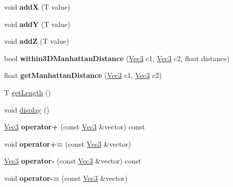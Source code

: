 \begin{DoxyCompactItemize}
\item 
\hypertarget{classVec3_a62a51e17139ac62fde2a8e764b423aa5}{}void {\bfseries add\+X} (T value)\label{classVec3_a62a51e17139ac62fde2a8e764b423aa5}

\item 
\hypertarget{classVec3_acedfa1c9f7193c47271c53dd08f883bc}{}void {\bfseries add\+Y} (T value)\label{classVec3_acedfa1c9f7193c47271c53dd08f883bc}

\item 
\hypertarget{classVec3_a7e31142017c656f7a8a20aa27641334d}{}void {\bfseries add\+Z} (T value)\label{classVec3_a7e31142017c656f7a8a20aa27641334d}

\item 
\hypertarget{classVec3_a705466eb1217ef25aca9482732d47f22}{}bool {\bfseries within3\+D\+Manhattan\+Distance} (\hyperlink{classVec3}{Vec3} c1, \hyperlink{classVec3}{Vec3} c2, float distance)\label{classVec3_a705466eb1217ef25aca9482732d47f22}

\item 
\hypertarget{classVec3_acfaec6bb2ef1e69dadce32ca48bfe8d7}{}float {\bfseries get\+Manhattan\+Distance} (\hyperlink{classVec3}{Vec3} c1, \hyperlink{classVec3}{Vec3} c2)\label{classVec3_acfaec6bb2ef1e69dadce32ca48bfe8d7}

\item 
T \hyperlink{classVec3_a01241f3738dd50013afc6c84e53a48a1}{get\+Length} ()
\item 
void \hyperlink{classVec3_ad648937145b298fa1f018143d34c56e9}{display} ()
\item 
\hypertarget{classVec3_a19831387133a4ff98f8881d3b667e694}{}\hyperlink{classVec3}{Vec3} {\bfseries operator+} (const \hyperlink{classVec3}{Vec3} \&vector) const \label{classVec3_a19831387133a4ff98f8881d3b667e694}

\item 
\hypertarget{classVec3_a500dc9307709f76f8c8dd8cdbb5eb729}{}void {\bfseries operator+=} (const \hyperlink{classVec3}{Vec3} \&vector)\label{classVec3_a500dc9307709f76f8c8dd8cdbb5eb729}

\item 
\hypertarget{classVec3_a639c69231c65cee4bcf134c68d255b6b}{}\hyperlink{classVec3}{Vec3} {\bfseries operator-\/} (const \hyperlink{classVec3}{Vec3} \&vector) const \label{classVec3_a639c69231c65cee4bcf134c68d255b6b}

\item 
\hypertarget{classVec3_a0e189b4d60af3a7ed7fc4b66ce842314}{}void {\bfseries operator-\/=} (const \hyperlink{classVec3}{Vec3} \&vector)\label{classVec3_a0e189b4d60af3a7ed7fc4b66ce842314}


\end{DoxyCompactItemize}
